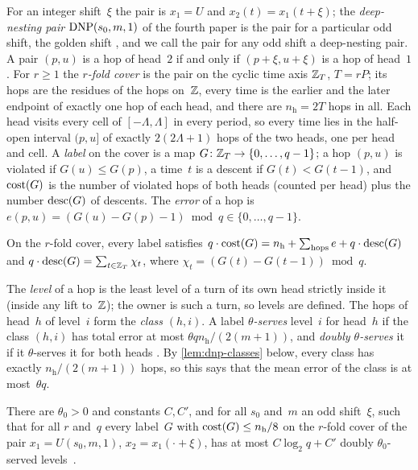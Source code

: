 For an integer shift~$\xi$ the pair is $x_1=U$ and $x_2(t)=x_1(t+\xi)$; the \emph{deep-nesting pair}
$\mathrm{DNP}(s_0,m,1)$ of the fourth paper is the pair for a particular odd shift, the golden shift
\cite[Definition~5.9]{FourthPaper2026}, and we call the pair for any odd shift a deep-nesting pair. A pair $(p,u)$ is a hop
of head~$2$ if and only if $(p+\xi,u+\xi)$ is a hop of head~$1$. For $r\ge1$ the \emph{$r$-fold cover} is the pair on the
cyclic time axis $\mathbb{Z}_T$, $T=rP$; its hops are the residues of the hops on~$\mathbb{Z}$, every time is the earlier and the
later endpoint of exactly one hop of each head, and there are $n_{\mathrm h}=2T$ hops in all. Each head visits every cell of
$[-\Lambda,\Lambda]$ in every period, so every time lies in the half-open interval $(p,u]$ of exactly $2(2\Lambda+1)$ hops of
the two heads, one per head and cell. A \emph{label} on the cover is a map $G\colon\mathbb{Z}_T\to\{0,\dots,q-1\}$; a hop $(p,u)$
is violated if $G(u)\le G(p)$, a time~$t$ is a descent if $G(t)<G(t-1)$, and $\mathrm{cost}(G)$ is the number of violated hops of
both heads (counted per head) plus the number $\mathrm{desc}(G)$ of descents. The \emph{error} of a hop is
$e(p,u)=(G(u)-G(p)-1)\bmod q\in\{0,\dots,q-1\}$.

\begin{lemma}\label{lem:Zq4}
On the $r$-fold cover, every label satisfies $q\cdot\mathrm{cost}(G)=n_{\mathrm h}+\sum_{\text{hops}}e+q\cdot\mathrm{desc}(G)$ and
$q\cdot\mathrm{desc}(G)=\sum_{t\in\mathbb{Z}_T}\chi_t$, where $\chi_t=(G(t)-G(t-1))\bmod q$.
\end{lemma}

The \emph{level} of a hop is the least level of a turn of its own head strictly inside it (inside any lift to~$\mathbb{Z}$); the
owner is such a turn, so levels are defined. The hops of head~$h$ of level~$i$ form the \emph{class} $(h,i)$. A label
\emph{$\theta$-serves} level~$i$ for head~$h$ if the class $(h,i)$ has total error at most
$\theta qn_{\mathrm h}/(2(m+1))$, and \emph{doubly $\theta$-serves} it if it $\theta$-serves it for both heads
\cite[Section~5.7]{FourthPaper2026}. By \cref{lem:dnp-classes} below, every class has exactly $n_{\mathrm h}/(2(m+1))$
hops, so this says that the mean error of the class is at most~$\theta q$.

\begin{conjecture}\label{conj:Aprime}
There are $\theta_0>0$ and constants $C,C'$, and for all $s_0$ and~$m$ an odd shift~$\xi$, such that for all $r$ and~$q$
every label~$G$ with $\mathrm{cost}(G)\le n_{\mathrm h}/8$ on the $r$-fold cover of the pair $x_1=U(s_0,m,1)$,
$x_2=x_1(\cdot+\xi)$, has at most $C\log_2q+C'$ doubly $\theta_0$-served levels~\cite[Conjecture~5.25]{FourthPaper2026}.
\end{conjecture}

